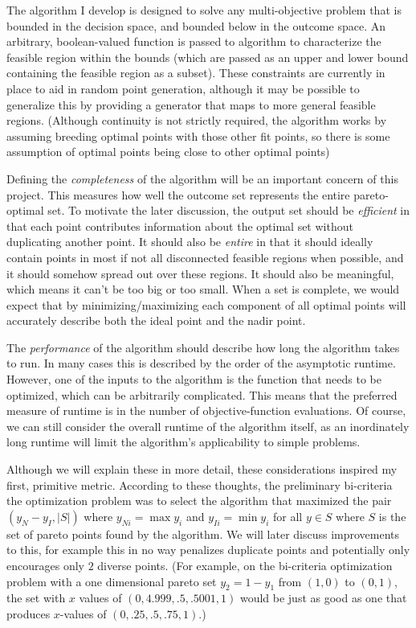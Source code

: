 \documentclass{article}
\begin{document}
The algorithm I develop is designed to solve any multi-objective problem that is bounded in the decision space, and bounded below in the outcome space.
An arbitrary, boolean-valued function is passed to algorithm to characterize the feasible region within the bounds (which are passed as an upper and lower bound containing the feasible region as a subset).
These constraints are currently in place to aid in random point generation, although it may be possible to generalize this by providing a generator that maps to more general feasible regions.
(Although continuity is not strictly required, the algorithm works by assuming breeding optimal points with those other fit points,
so there is some assumption of optimal points being close to other optimal points)

Defining the \emph{completeness} of the algorithm will be an important concern of this project.
This measures how well the outcome set represents the entire pareto-optimal set.
To motivate the later discussion, the output set should be \emph{efficient} in that each point contributes information about the optimal set without duplicating another point.
It should also be \emph{entire} in that it should ideally contain points in most if not all disconnected feasible regions when possible, and it should somehow spread out over these regions.
It should also be meaningful, which means it can't be too big or too small.
When a set is complete, we would expect that by minimizing/maximizing each component of all optimal points will accurately describe both the ideal point and the nadir point.


The \emph{performance} of the algorithm should describe how long the algorithm takes to run.
In many cases this is described by the order of the asymptotic runtime.
However, one of the inputs to the algorithm is the function that needs to be optimized, which can be arbitrarily complicated.
This means that the preferred measure of runtime is in the number of objective-function evaluations.
Of course, we can still consider the overall runtime of the algorithm itself, as an inordinately long runtime will limit the algorithm's applicability to simple problems.


Although we will explain these in more detail, these considerations inspired my first, primitive metric.
According to these thoughts, the preliminary bi-criteria the optimization problem was to select the algorithm that maximized the
pair $(y_N - y_I, |S|)$ where $y_{Ni} = \max y_i $ and $y_{Ii} = \min y_i$ for all $y \in S$ where $S$ is the set of pareto points found by the algorithm.
We will later discuss improvements to this, for example this in no way penalizes duplicate points and potentially only encourages only $2$ diverse points.
(For example, on the bi-criteria optimization problem with a one dimensional pareto set $y_2 = 1-y_1$ from $(1,0)$ to $(0,1)$, the set with $x$ values of $(0, 4.999, .5, .5001, 1)$
would be just as good as one that produces $x$-values of $(0, .25,  .5, .75 ,1)$.)
\end{document}
